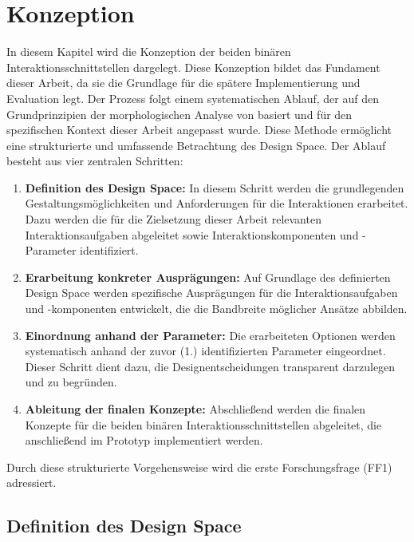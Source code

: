 \chapter{Konzeption}
\label{chap:Konzept}


In diesem Kapitel wird die Konzeption der beiden binären Interaktionsschnittstellen dargelegt. Diese Konzeption bildet das Fundament dieser Arbeit, da sie die Grundlage für die spätere Implementierung und Evaluation legt. Der Prozess folgt einem systematischen Ablauf, der auf den Grundprinzipien der morphologischen Analyse von \citet{10.1007/978-3-642-87617-2_14} basiert und für den spezifischen Kontext dieser Arbeit angepasst wurde. Diese Methode ermöglicht eine strukturierte und umfassende Betrachtung des Design Space. Der Ablauf besteht aus vier zentralen Schritten:

\begin{enumerate}
    \item \textbf{Definition des Design Space:}
    In diesem Schritt werden die grundlegenden Gestaltungsmöglichkeiten und Anforderungen für die Interaktionen erarbeitet. Dazu werden die für die Zielsetzung dieser Arbeit relevanten Interaktionsaufgaben abgeleitet sowie Interaktionskomponenten und -Parameter identifiziert.
    \item \textbf{Erarbeitung konkreter Ausprägungen:}
    Auf Grundlage des definierten Design Space werden spezifische Ausprägungen für die Interaktionsaufgaben und -komponenten entwickelt, die die Bandbreite möglicher Ansätze abbilden.
    \item \textbf{Einordnung anhand der Parameter:}
    Die erarbeiteten Optionen werden systematisch anhand der zuvor (1.) identifizierten Parameter eingeordnet. Dieser Schritt dient dazu, die Designentscheidungen transparent darzulegen und zu begründen.
    \item \textbf{Ableitung der finalen Konzepte:}
    Abschließend werden die finalen Konzepte für die beiden binären Interaktionsschnittstellen abgeleitet, die anschließend im Prototyp implementiert werden.
\end{enumerate}
 
Durch diese strukturierte Vorgehensweise wird die erste Forschungsfrage (FF1) adressiert.   

\section{Definition des Design Space}
\label{subchap:DesignSpace}

